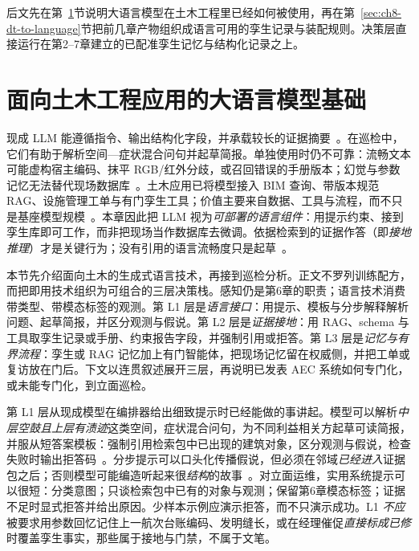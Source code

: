 后文先在第~\ref{sec:ch8-llm-foundations}节说明大语言模型在土木工程里已经如何被使用，再在第~\ref{sec:ch8-dt-to-language}节把前几章产物组织成语言可用的孪生记录与装配规则。决策层直接运行在第2--7章建立的已配准孪生记忆与结构化记录之上。


\section{面向土木工程应用的大语言模型基础}
\label{sec:ch8-llm-foundations}

现成 LLM 能遵循指令、输出结构化字段，并承载较长的证据摘要~\cite{brown2020,ouyang2022instructgpt,vaswani2017attention}。在巡检中，它们有助于解析空间—症状混合问句并起草简报。单独使用时仍不可靠：流畅文本可能虚构宿主编码、抹平 RGB/红外分歧，或召回错误的手册版本；幻觉与参数记忆无法替代现场数据库~\cite{ji2023,lewis2020,saka2024gptconstruction}。土木应用已将模型接入 BIM 查询、带版本规范 RAG、设施管理工单与有门孪生工具；价值主要来自数据、工具与流程，而不只是基座模型规模~\cite{zheng2023bimassistant,joffe2025buildingcodes,krutli2025fmrags,gao2026ifcagent,luo2025llmdtrobot,ma2026tenquestions}。本章因此把 LLM 视为\emph{可部署的语言组件}：用提示约束、接到孪生库即可工作，而非把现场当作数据库去微调。依据检索到的证据作答（即\emph{接地推理}）才是关键行为；没有引用的语言流畅度只是起草~\cite{lewis2020,krutli2025fmrags}。

本节先介绍面向土木的生成式语言技术，再接到巡检分析。正文不罗列训练配方，而把即用技术组织为可组合的三层决策栈。感知仍是第6章的职责；语言技术消费带类型、带模态标签的观测。第 L1 层是\emph{语言接口}：用提示、模板与分步解释解析问题、起草简报，并区分观测与假说。第 L2 层是\emph{证据接地}：用 RAG、schema 与工具取孪生记录或手册、约束报告字段，并强制引用或拒答。第 L3 层是\emph{记忆与有界流程}：孪生或 RAG 记忆加上有门智能体，把现场记忆留在权威侧，并把工单或复访放在门后。下文以连贯叙述展开三层，再说明已发表 AEC 系统如何专门化，或未能专门化，到立面巡检。

第 L1 层从现成模型在编排器给出细致提示时已经能做的事讲起。模型可以解析\emph{中层空鼓且上层有渍迹}这类空间，症状混合问句，为不同利益相关方起草可读简报，并服从短答案模板：强制引用检索包中已出现的建筑对象，区分观测与假说，检查失败时输出拒答码~\cite{ouyang2022instructgpt,ji2023}。分步提示可以口头化传播假说，但必须在邻域\emph{已经进入}证据包之后；否则模型可能编造听起来很\emph{结构}的故事~\cite{wei2022cot,ji2023}。对立面运维，实用系统提示可以很短：分类意图；只谈检索包中已有的对象与观测；保留第6章模态标签；证据不足时显式拒答并给出原因。少样本示例应演示拒答，而不只演示成功。L1 \emph{不应}被要求用参数回忆记住上一航次台账编码、发明缝长，或在经理催促\emph{直接标成已修}时覆盖孪生事实，那些属于接地与门禁，不属于文笔。

